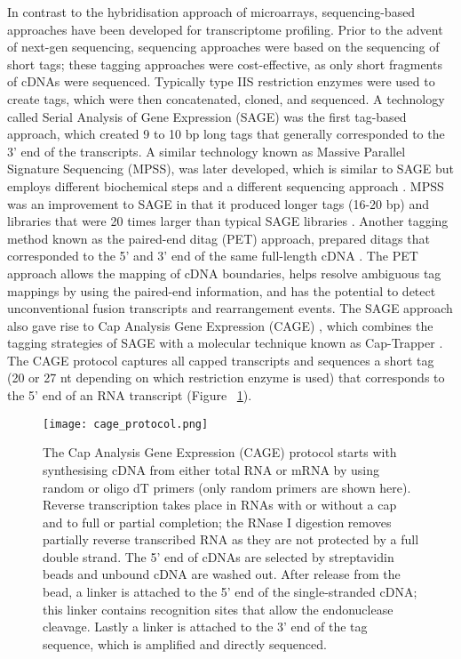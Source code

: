 In contrast to the hybridisation approach of microarrays, sequencing-based approaches have been developed for transcriptome profiling. Prior to the advent of next-gen sequencing, sequencing approaches were based on the sequencing of short tags; these tagging approaches were cost-effective, as only short fragments of cDNAs were sequenced. Typically type IIS restriction enzymes were used to create tags, which were then concatenated, cloned, and sequenced. A technology called Serial Analysis of Gene Expression (SAGE) \citep{pmid7570003} was the first tag-based approach, which created 9 to 10 bp long tags that generally corresponded to the 3' end of the transcripts. A similar technology known as Massive Parallel Signature Sequencing (MPSS), was later developed, which is similar to SAGE but employs different biochemical steps and a different sequencing approach \citep{pmid10835600}. MPSS was an improvement to SAGE in that it produced longer tags (16-20 bp) and libraries that were 20 times larger than typical SAGE libraries \citep{pmid10835600}. Another tagging method known as the paired-end ditag (PET) approach, prepared ditags that corresponded to the 5' and 3' end of the same full-length cDNA \citep{pmid15782207}. The PET approach allows the mapping of cDNA boundaries, helps resolve ambiguous tag mappings by using the paired-end information, and has the potential to detect unconventional fusion transcripts and rearrangement events. The SAGE approach also gave rise to Cap Analysis Gene Expression (CAGE) \citep{pmid14663149}, which combines the tagging strategies of SAGE with a molecular technique known as Cap-Trapper \citep{pmid8938445,pmid9179497}. The CAGE protocol captures all capped transcripts and sequences a short tag (20 or 27 nt depending on which restriction enzyme is used) that corresponds to the 5' end of an RNA transcript (Figure ~\ref{fig:cage_protocol}).

\begin{figure}[!ht]
   \centering
   \texttt{[image: cage\_protocol.png]}
   \caption[Cap Analysis Gene Expression protocol]{The Cap Analysis Gene Expression (CAGE) protocol starts with synthesising cDNA from either total RNA or mRNA by using random or oligo dT primers (only random primers are shown here). Reverse transcription takes place in RNAs with or without a cap and to full or partial completion; the RNase I digestion removes partially reverse transcribed RNA as they are not protected by a full double strand. The 5' end of cDNAs are selected by streptavidin beads and unbound cDNA are washed out. After release from the bead, a linker is attached to the 5' end of the single-stranded cDNA; this linker contains recognition sites that allow the endonuclease cleavage. Lastly a linker is attached to the 3' end of the tag sequence, which is amplified and directly sequenced.}
   \label{fig:cage_protocol}
\end{figure}

